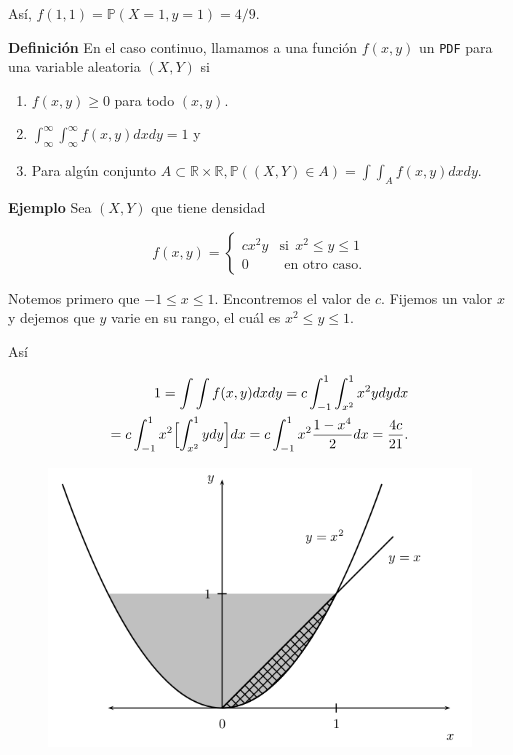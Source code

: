 \documentclass{article}\usepackage[]{graphicx}\usepackage[]{color}
\begin{document}
\vspace{0.2cm}

As\'i, $f(1,1) = \mathbb{P}(X = 1,y =1) = 4/9$.

\vspace{0.5cm}

\textbf{Definici\'on} En el caso continuo, llamamos a una funci\'on $f(x,y)$ un \texttt{PDF} para una variable aleatoria $(X,Y)$ si

\begin{enumerate}
\item $f(x,y) \geq 0$ para todo $(x,y)$.
\item $\int_{\infty}^{\infty}\int_{\infty}^{\infty}f(x,y)dxdy = 1$ y
\item Para alg\'un conjunto $A \subset \mathbb{R} \times \mathbb{R}, \mathbb{P}((X,Y) \in A) = \int \int_{A}f(x,y)dxdy$.
\end{enumerate}

\vspace{0.3cm}

\textbf{Ejemplo} Sea $(X,Y)$ que tiene densidad

\[
f(x,y)= \begin{cases}
cx^2y & \mbox{si}\ \  x^2 \leq y \leq 1\\
0 & \mbox{ en otro caso}.
\end{cases}
\]

\vspace{0.2cm}

Notemos primero que $-1 \leq x \leq 1$. Encontremos el valor de $c$. Fijemos un valor $x$ y dejemos que $y$ varie en su rango, el cu\'al es $x^2 \leq y \leq 1$.

\vspace{0.3cm}

As\'i

\begin{align*}
1 = \int\int f(x,y)dxdy = c\int_{-1}^{1}\int_{x^2}^{1}x^2ydydx \\
= c\int_{-1}^{1}x^2\Bigl[\int_{x^2}^{1}ydy\Bigr]dx = c \int_{-1}^{1}x^2\frac{1 -x^4}{2}dx = \frac{4c}{21}.
\end{align*}

\vspace{0.2cm}
\begin{figure}[h]
\centering
\includegraphics[scale=.45]{graff1-tu.png}
\end{figure}
\end{document}
